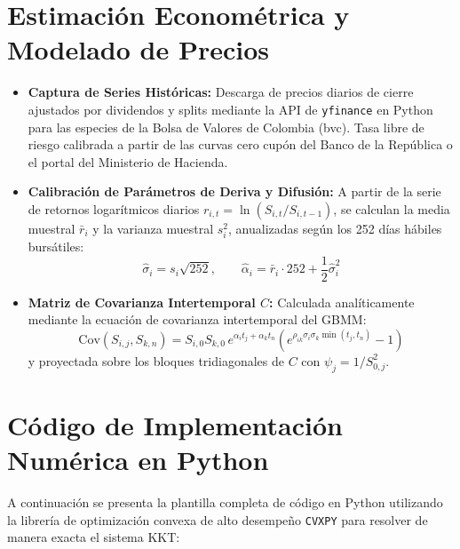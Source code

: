 \documentclass[11pt,a4paper]{report}
\numberwithin{equation}{chapter}
\begin{document}
\section{Estimación Econométrica y Modelado de Precios}

\begin{itemize}[leftmargin=2em]
    \item \textbf{Captura de Series Históricas:} Descarga de precios diarios de cierre ajustados por dividendos y splits mediante la API de \texttt{yfinance} en Python para las especies de la Bolsa de Valores de Colombia (bvc). Tasa libre de riesgo calibrada a partir de las curvas cero cupón del Banco de la República o el portal del Ministerio de Hacienda.
    \item \textbf{Calibración de Parámetros de Deriva y Difusión:} 
    A partir de la serie de retornos logarítmicos diarios $r_{i,t} = \ln(S_{i,t}/S_{i,t-1})$, se calculan la media muestral $\bar{r}_i$ y la varianza muestral $s_i^2$, anualizadas según los 252 días hábiles bursátiles:
    \begin{equation}
        \hat{\sigma}_i = s_i \sqrt{252}, \qquad \hat{\alpha}_i = \bar{r}_i \cdot 252 + \frac{1}{2} \hat{\sigma}_i^2
    \end{equation}
    \item \textbf{Matriz de Covarianza Intertemporal $C$:}
    Calculada analíticamente mediante la ecuación de covarianza intertemporal del GBMM:
    \begin{equation}
        \mathrm{Cov}(S_{i,j}, S_{k,n}) = S_{i,0} S_{k,0} \, e^{\alpha_i t_j + \alpha_k t_n} \left( e^{\rho_{ik} \sigma_i \sigma_k \min(t_j, t_n)} - 1 \right)
    \end{equation}
    y proyectada sobre los bloques tridiagonales de $C$ con $\psi_j = 1/S_{0,j}^2$.
\end{itemize}

\section{Código de Implementación Numérica en Python}

A continuación se presenta la plantilla completa de código en Python utilizando la librería de optimización convexa de alto desempeño \texttt{CVXPY} para resolver de manera exacta el sistema KKT:
\end{document}
